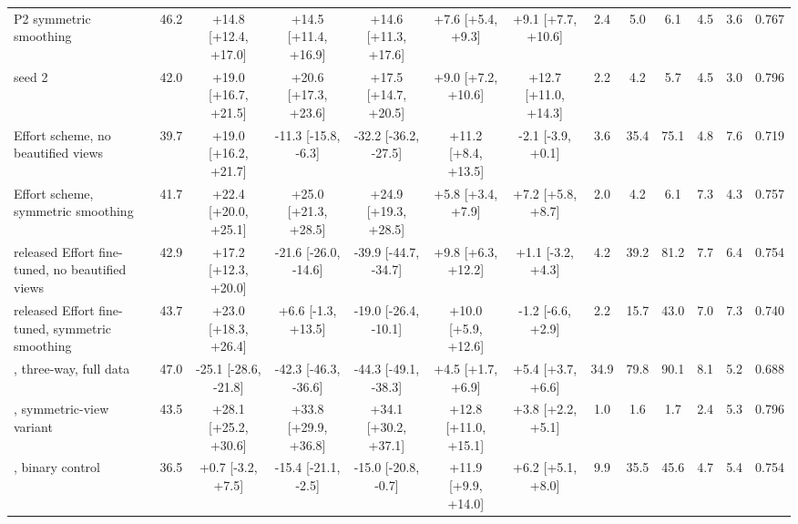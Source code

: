 \begin{tabular}{@{}l c ccccc ccccc c@{}}
P2 symmetric smoothing & 46.2 & +14.8 [+12.4, +17.0] & +14.5 [+11.4, +16.9] & +14.6 [+11.3, +17.6] & +7.6 [+5.4, +9.3] & +9.1 [+7.7, +10.6] & 2.4 & 5.0 & 6.1 & 4.5 & 3.6 & 0.767 \\
\quad seed 2 & 42.0 & +19.0 [+16.7, +21.5] & +20.6 [+17.3, +23.6] & +17.5 [+14.7, +20.5] & +9.0 [+7.2, +10.6] & +12.7 [+11.0, +14.3] & 2.2 & 4.2 & 5.7 & 4.5 & 3.0 & 0.796 \\
Effort scheme, no beautified views & 39.7 & +19.0 [+16.2, +21.7] & -11.3 [-15.8, -6.3] & -32.2 [-36.2, -27.5] & +11.2 [+8.4, +13.5] & -2.1 [-3.9, +0.1] & 3.6 & 35.4 & 75.1 & 4.8 & 7.6 & 0.719 \\
Effort scheme, symmetric smoothing & 41.7 & +22.4 [+20.0, +25.1] & +25.0 [+21.3, +28.5] & +24.9 [+19.3, +28.5] & +5.8 [+3.4, +7.9] & +7.2 [+5.8, +8.7] & 2.0 & 4.2 & 6.1 & 7.3 & 4.3 & 0.757 \\
released Effort fine-tuned, no beautified views & 42.9 & +17.2 [+12.3, +20.0] & -21.6 [-26.0, -14.6] & -39.9 [-44.7, -34.7] & +9.8 [+6.3, +12.2] & +1.1 [-3.2, +4.3] & 4.2 & 39.2 & 81.2 & 7.7 & 6.4 & 0.754 \\
released Effort fine-tuned, symmetric smoothing & 43.7 & +23.0 [+18.3, +26.4] & +6.6 [-1.3, +13.5] & -19.0 [-26.4, -10.1] & +10.0 [+5.9, +12.6] & -1.2 [-6.6, +2.9] & 2.2 & 15.7 & 43.0 & 7.0 & 7.3 & 0.740 \\
\ours{}, three-way, full data & 47.0 & -25.1 [-28.6, -21.8] & -42.3 [-46.3, -36.6] & -44.3 [-49.1, -38.3] & +4.5 [+1.7, +6.9] & +5.4 [+3.7, +6.6] & 34.9 & 79.8 & 90.1 & 8.1 & 5.2 & 0.688 \\
\ours{}, symmetric-view variant & 43.5 & +28.1 [+25.2, +30.6] & +33.8 [+29.9, +36.8] & +34.1 [+30.2, +37.1] & +12.8 [+11.0, +15.1] & +3.8 [+2.2, +5.1] & 1.0 & 1.6 & 1.7 & 2.4 & 5.3 & 0.796 \\
\ours{}, binary control & 36.5 & +0.7 [-3.2, +7.5] & -15.4 [-21.1, -2.5] & -15.0 [-20.8, -0.7] & +11.9 [+9.9, +14.0] & +6.2 [+5.1, +8.0] & 9.9 & 35.5 & 45.6 & 4.7 & 5.4 & 0.754 \\
\bottomrule
\end{tabular}
